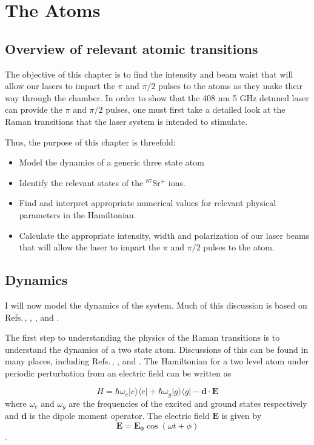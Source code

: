\chapter{The Atoms} \label{ChapterAboutTheAtoms}
\section{Overview of relevant atomic transitions}

The objective of this chapter is to find the intensity and beam waist that will allow our lasers to impart the $\pi$ and $\pi/2$ pulses to the atoms as they make their way through the chamber. In order to show that the 408 nm 5 GHz detuned laser can provide the $\pi$ and $\pi/2$ pulses, one must first take a detailed look at the Raman transitions that the laser system is intended to stimulate.

Thus, the purpose of this chapter is threefold:
\begin{itemize}
\item Model the dynamics of a generic three state atom
\item Identify the relevant states of the $^{87}$Sr$^+$ ions.
\item Find and interpret appropriate numerical values for relevant physical parameters in the Hamiltonian.
\item Calculate the appropriate intensity, width and polarization of our laser beams that will allow the laser to impart the $\pi$ and $\pi/2$ pulses to the atom. 
\end{itemize}

\section{Dynamics}\label{dynamicsSection}

I will now model the dynamics of the system. Much of this discussion is based on Refs.\,\cite{Young1997363}, \cite{gustavsonThesis}, \cite{footAtomicPhysics}, \cite{cjeDiss} and \cite{RamanBeamSplit}. 

The first step to understanding the physics of the Raman transitions is to understand the dynamics of a two state atom. Discussions of this can be found in many places, including Refs.\,\cite{cohenTannoudji}, \cite{demilleBudkerKimball}, and \cite{Young1997363}. The Hamiltonian for a two level atom under periodic perturbation from an electric field can be written as 

\begin{equation}
H = \hbar \omega_e |e\rangle\langle e| + \hbar \omega_g |g\rangle\langle g| - \mathbf{d}\cdot\mathbf{E}
\end{equation}  
where $\omega_e$ and $\omega_g$ are the frequencies of the excited and ground states respectively and $\mathbf{d}$ is the dipole moment operator. The electric field $\mathbf{E}$ is given by 
\begin{equation}
\mathbf{E} = \mathbf{E_0} \cos (\omega t + \phi)
\end{equation}
\cite{Young1997363}. 

